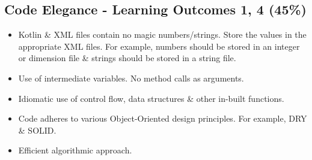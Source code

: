 \documentclass{article}
\begin{document}
\subsection*{Code Elegance - Learning Outcomes 1, 4 (45\%)}
\begin{itemize}
    \item Kotlin \& XML files contain no magic numbers/strings. Store the values in the appropriate XML files. For example, numbers should be stored in an integer or dimension file \& strings should be stored in a string file.
    \item Use of intermediate variables. No method calls as arguments.
    \item Idiomatic use of control flow, data structures \& other in-built functions.
    \item Code adheres to various Object-Oriented design principles. For example, DRY \& SOLID.
    \item Efficient algorithmic approach.
\end{itemize}
\end{document}
